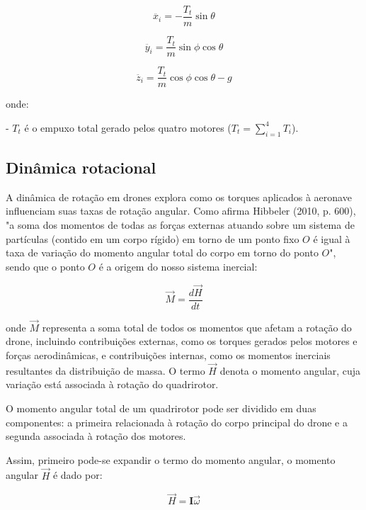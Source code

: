 \begin{equation}
\ddot{x_i} = -\frac{T_t}{m} \sin\theta
\end{equation}

\begin{equation}
\ddot{y_i} = \frac{T_t}{m} \sin\phi \cos\theta
\end{equation}

\begin{equation}
\ddot{z_i} = \frac{T_t}{m} \cos\phi \cos\theta - g
\end{equation}

onde:

- \(T_t\) é o empuxo total gerado pelos quatro motores (\(T_t = \sum_{i=1}^{4} T_i\)).

\subsection{Dinâmica rotacional}

A dinâmica de rotação em drones explora como os torques aplicados à aeronave influenciam suas taxas de rotação angular. Como afirma Hibbeler (2010, p. 600), "a soma dos momentos de todas as forças externas atuando sobre um sistema de partículas (contido em um corpo rígido) em torno de um ponto fixo \(O\) é igual à taxa de variação do momento angular total do corpo em torno do ponto \(O\)", sendo que o ponto \(O\) é a origem do nosso sistema inercial:

\begin{equation}
\vec{M} = \frac{d\vec{H}}{dt}
\end{equation}

onde \(\vec{M}\) representa a soma total de todos os momentos que afetam a rotação do drone, incluindo contribuições externas, como os torques gerados pelos motores e forças aerodinâmicas, e contribuições internas, como os momentos inerciais resultantes da distribuição de massa. O termo \(\vec{H}\) denota o momento angular, cuja variação está associada à rotação do quadrirotor.

O momento angular total de um quadrirotor pode ser dividido em duas componentes: a primeira relacionada à rotação do corpo principal do drone e a segunda associada à rotação dos motores.

Assim, primeiro pode-se expandir o termo do momento angular, o momento angular \(\vec{H}\) é dado por:

\begin{equation}
	\vec{H} = \mathbf{I} \vec{\omega}
\end{equation}

